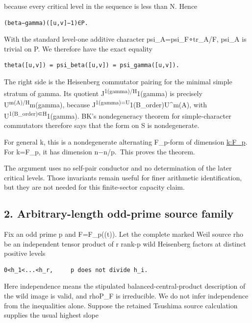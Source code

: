 because every critical level in the sequence is less than N. Hence

\begin{Verbatim}[fontsize=\small,breaklines=true,breakanywhere=true]
(beta−gamma)([u,v]−1)∈P.
\end{Verbatim}

With the standard level-one additive character psi\_A=psi\_F∘tr\_A/F,
psi\_A is trivial on P. We therefore have the exact equality

\begin{Verbatim}[fontsize=\small,breaklines=true,breakanywhere=true]
theta([u,v]) = psi_beta([u,v]) = psi_gamma([u,v]).
\end{Verbatim}

The right side is the Heisenberg commutator pairing for the minimal
simple stratum of gamma. Its quotient
J\textsuperscript{1(gamma)/H}1(gamma) is precisely
U\textsuperscript{m(A)/H}m(gamma), because
J\textsuperscript{1(gamma)=U}1(B\_order)U\^{}m(A), with
U\textsuperscript{1(B\_order)⊂H}1(gamma). BK's nondegeneracy theorem for
simple-character commutators therefore says that the form on S is
nondegenerate.

For general k, this is a nondegenerate alternating F\_p-form of
dimension \href{n−n/p}{k:F\_p}. For k=F\_p, it has dimension n−n/p.~This
proves the theorem.

The argument uses no self-pair conductor and no determination of the
later critical levels. Those invariants remain useful for finer
arithmetic identification, but they are not needed for this
finite-sector capacity claim.

\hypertarget{odd_capacity-arbitrary-length-odd-prime-source-family}{%
\subsection{2. Arbitrary-length odd-prime source
family}\label{odd_capacity-arbitrary-length-odd-prime-source-family}}

Fix an odd prime p and F=F\_p((t)). Let the complete marked Weil source
rho be an independent tensor product of r rank-p wild Heisenberg factors
at distinct positive levels

\begin{Verbatim}[fontsize=\small,breaklines=true,breakanywhere=true]
0<h_1<...<h_r,     p does not divide h_i.
\end{Verbatim}

Here independence means the stipulated balanced-central-product
description of the wild image is valid, and rho\textbar P\_F is
irreducible. We do not infer independence from the inequalities alone.
Suppose the retained Tsushima source calculation supplies the usual
highest slope

